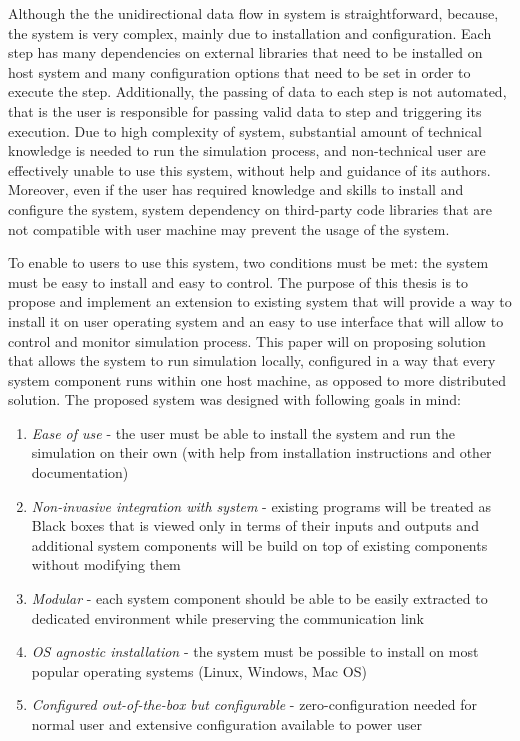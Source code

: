 Although the the unidirectional data flow in system is straightforward, because, the system is very complex, mainly due to installation and configuration. Each step has many dependencies on external libraries that need to be installed on host system and many configuration options that need to be set in order to execute the step. Additionally, the passing of data to each step is not automated, that is the user is responsible for passing valid data to step and triggering its execution. Due to high complexity of system, substantial amount of technical knowledge is needed to run the simulation process, and non-technical user are effectively unable to use this system, without help and guidance of its authors. Moreover, even if the user has required knowledge and skills to install and configure the system, system dependency on third-party code libraries that are not compatible with user machine may prevent the usage of the system. 

To enable to users to use this system, two conditions must be met: the system must be easy to install and easy to control. The purpose of this thesis is to propose and implement an extension to  existing system that will provide a way to install it on user operating system and an easy to use interface that will allow to control and monitor simulation process. This paper will on proposing solution that allows the system to run simulation locally, configured in a way that every system component runs within one host machine, as opposed to more distributed solution. The proposed system was designed with following goals in mind:
\begin{enumerate}
    \item {
        \textit{Ease of use} - the user must be able to install the system and run the simulation on their own (with help from installation instructions and other documentation)
    }
    \item {
        \textit{Non-invasive integration with system} - existing programs will be treated as Black boxes that is viewed only in terms of their inputs and outputs and additional system components will be build on top of existing components without modifying them
    }
    \item {
        \textit{Modular} - each system component should be able to be easily extracted to dedicated environment while preserving the communication link 
    }
    \item {
        \textit{OS agnostic installation} - the system must be possible to install on most popular operating systems (Linux, Windows, Mac OS)
    } 
    \item{
        \textit{Configured out-of-the-box but configurable} - zero-configuration needed for normal user and extensive configuration available to power user
    }
\end{enumerate}
